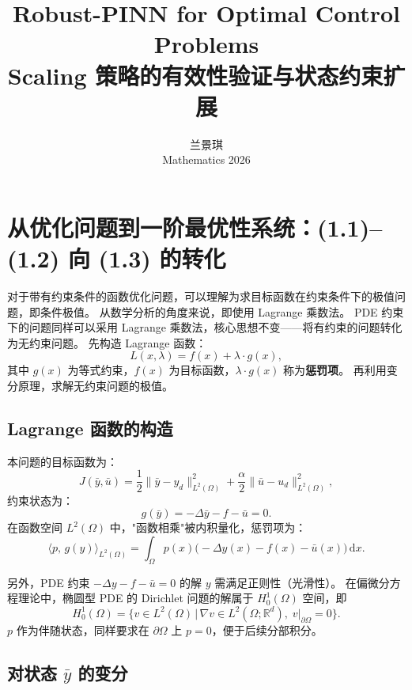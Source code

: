 \documentclass[UTF8, 12pt]{ctexart}
\title{\textbf{Robust-PINN for Optimal Control Problems}\\[6pt]
       \large Scaling 策略的有效性验证与状态约束扩展}
\author{兰景琪\\[2pt] \small Mathematics 2026}
\date{}
\begin{document}
\maketitle

\tableofcontents
\newpage

\section{从优化问题到一阶最优性系统：(1.1)--(1.2) 向 (1.3) 的转化}
\label{sec:derivation}

对于带有约束条件的函数优化问题，可以理解为求目标函数在约束条件下的极值问题，即条件极值。
从数学分析的角度来说，即使用 Lagrange 乘数法。
PDE 约束下的问题同样可以采用 Lagrange 乘数法，核心思想不变——将有约束的问题转化为无约束问题。
先构造 Lagrange 函数：
\[
  L(x,\lambda) = f(x) + \lambda \cdot g(x),
\]
其中 $g(x)$ 为等式约束，$f(x)$ 为目标函数，$\lambda \cdot g(x)$ 称为\textbf{惩罚项}。
再利用变分原理，求解无约束问题的极值。

\subsection{Lagrange 函数的构造}

本问题的目标函数为：
\begin{equation}
  J(\bar{y}, \bar{u})
  = \frac{1}{2}\|\bar{y} - y_d\|_{L^2(\Omega)}^2
  + \frac{\alpha}{2}\|\bar{u} - u_d\|_{L^2(\Omega)}^2,
  \label{eq:objective}
\end{equation}
约束状态为：
\begin{equation}
  g(\bar{y}) = -\Delta\bar{y} - f - \bar{u} = 0.
  \label{eq:constraint}
\end{equation}
在函数空间 $L^2(\Omega)$ 中，"函数相乘"被内积量化，惩罚项为：
\begin{equation}
  \langle p,\, g(y)\rangle_{L^2(\Omega)}
  = \int_\Omega p(x)\bigl(-\Delta y(x) - f(x) - \bar{u}(x)\bigr)\,\mathrm{d}x.
  \label{eq:penalty-term}
\end{equation}

另外，PDE 约束 $-\Delta y - f - \bar{u} = 0$ 的解 $y$ 需满足正则性（光滑性）。
在偏微分方程理论中，椭圆型 PDE 的 Dirichlet 问题的解属于 $H_0^1(\Omega)$ 空间，即
\[
  H_0^1(\Omega) = \bigl\{v \in L^2(\Omega) \,\big|\, \nabla v \in L^2(\Omega;\mathbb{R}^d),\;
  v\big|_{\partial\Omega} = 0\bigr\}.
\]
$p$ 作为伴随状态，同样要求在 $\partial\Omega$ 上 $p=0$，便于后续分部积分。

\subsection{对状态 $\bar{y}$ 的变分}
\end{document}
